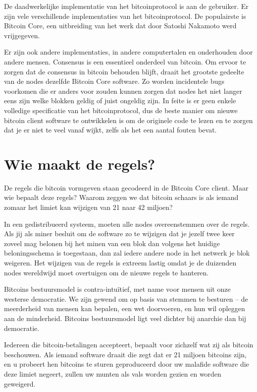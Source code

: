 \documentclass[
  letterpaper,
]{scrbook}
\begin{document}
De daadwerkelijke implementatie van het bitcoinprotocol is aan de
gebruiker. Er zijn vele verschillende implementaties van het
bitcoinprotocol. De populairste is Bitcoin Core, een uitbreiding van het
werk dat door Satoshi Nakamoto werd vrijgegeven.

Er zijn ook andere implementaties, in andere computertalen en
onderhouden door andere mensen. Consensus is een essentieel onderdeel
van bitcoin. Om ervoor te zorgen dat de consensus in bitcoin behouden
blijft, draait het grootste gedeelte van de nodes dezelfde Bitcoin Core
software. Zo worden incidentele bugs voorkomen die er anders voor zouden
kunnen zorgen dat nodes het niet langer eens zijn welke blokken geldig
of juist ongeldig zijn. In feite is er geen enkele volledige
specificatie van het bitcoinprotocol, dus de beste manier om nieuwe
bitcoin client software te ontwikkelen is om de originele code te lezen
en te zorgen dat je er niet te veel vanaf wijkt, zelfs als het een
aantal fouten bevat.

\hypertarget{wie-maakt-de-regels}{%
\section{Wie maakt de regels?}\label{wie-maakt-de-regels}}

De regels die bitcoin vormgeven staan gecodeerd in de Bitcoin Core
client. Maar wie bepaalt deze regels? Waarom zeggen we dat bitcoin
schaars is als iemand zomaar het limiet kan wijzigen van 21 naar 42
miljoen?

In een gedistribueerd systeem, moeten alle nodes overeenstemmen over de
regels. Als jij als miner besluit om de software zo te wijzigen dat je
jezelf twee keer zoveel mag belonen bij het minen van een blok dan
volgens het huidige beloningsschema is toegestaan, dan zal iedere andere
node in het netwerk je blok weigeren. Het wijzigen van de regels is
extreem lastig omdat je de duizenden nodes wereldwijd moet overtuigen om
de nieuwe regels te hanteren.

Bitcoins bestuursmodel is contra-intuïtief, met name voor mensen uit
onze westerse democratie. We zijn gewend om op basis van stemmen te
besturen -- de meerderheid van mensen kan bepalen, een wet doorvoeren,
en hun wil opleggen aan de minderheid. Bitcoins bestuursmodel ligt veel
dichter bij anarchie dan bij democratie.

Iedereen die bitcoin-betalingen accepteert, bepaalt voor zichzelf wat
zij als bitcoin beschouwen. Als iemand software draait die zegt dat er
21 miljoen bitcoins zijn, en u probeert hen bitcoins te sturen
geproduceerd door uw malafide software die deze limiet negeert, zullen
uw munten als vals worden gezien en worden geweigerd.
\end{document}
